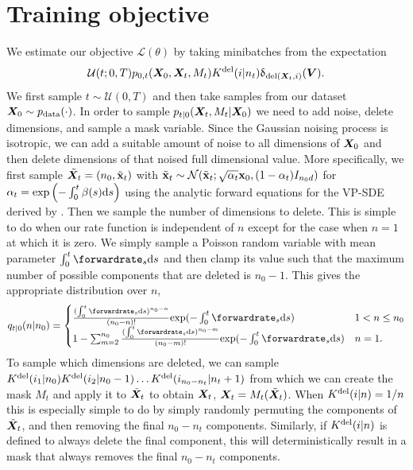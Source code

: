 \section{Training objective}
\label{sec:tddm-ApdxTrainingObjective}
We estimate our objective $\mathcal{L}(\theta)$ by taking minibatches from the expectation 
\begin{equation}
    \mathcal{U}(t; 0, T) p_{0,t}({\bm{X}}_0, {\bm{X}}_t, M_t) K^{\textup{del}}(i | n_t) \updelta_{\text{del}({\bm{X}}_t, i)}({\bm{V}}).
\end{equation}
We first sample $t \sim \mathcal{U}(0, T)$ and then take samples from our dataset ${\bm{X}}_0 \sim p_{\rm{data}}(\cdot)$. In order to sample $p_{t|0}({\bm{X}}_t, M_t | {\bm{X}}_0)$ we need to add noise, delete dimensions, and sample a mask variable. Since the Gaussian noising process is isotropic, we can add a suitable amount of noise to all dimensions of ${\bm{X}}_0$ and then delete dimensions of that noised full dimensional value. More specifically, we first sample $\tilde{{\bm{X}}}_t = (n_0, \tilde{{\mathbf{x}}}_t)$ with $\tilde{{\mathbf{x}}}_t \sim \mathcal{N}(\tilde{{\mathbf{x}}}_t; \sqrt{\alpha_t} {\mathbf{x}}_0, (1 - \alpha_t) I_{n_0 d})$ for $\alpha_t = \text{exp}\left( - \int_0^t \beta(s) \mathrm{d} s \right)$ using the analytic forward equations for the VP-SDE derived by \citet{song2020score}. Then we sample the number of dimensions to delete. This is simple to do when our rate function is independent of $n$ except for the case when $n=1$ at which it is zero. We simply sample a Poisson random variable with mean parameter $\int_0^t \forwardrate_s \rmd s$ and then clamp its value such that the maximum number of possible components that are deleted is $n_0 - 1$. This gives the appropriate distribution over $n$, 
\begin{equation}
    q_{t|0}(n | n_0) = \begin{cases}
         \frac{(\int_0^t \forwardrate_s \rmd s)^{n_0 - n}}{(n_0 - n)!} \text{exp}(- \int_0^t \forwardrate_s \rmd s)&\textstyle  1 < n \leq n_0 \\
        1 -  \sum_{m=2}^{n_0} \frac{(\int_0^t \forwardrate_s \rmd s)^{n_0 - m}}{(n_0 - m)!} \text{exp}(- \int_0^t \forwardrate_s \rmd s)  &\textstyle  n = 1.
    \end{cases}
\end{equation}
To sample which dimensions are deleted, we can sample $K^{\textup{del}}(i_1 | n_0) K^{\textup{del}}(i_2 | n_0-1) \dots K^{\textup{del}}(i_{n_0 - n_t} | n_t+1)$ from which we can create the mask $M_t$ and apply it to $\tilde{{\bm{X}}}_t$ to obtain ${\bm{X}}_t$, ${\bm{X}}_t = M_t(\tilde{{\bm{X}}}_t)$. When $K^{\textup{del}}(i | n) = 1/n$ this is especially simple to do by simply randomly permuting the components of $\tilde{{\bm{X}}}_t$, and then removing the final $n_0 - n_t$ components. Similarly, if $K^{\textup{del}}(i | n)$ is defined to always delete the final component, this will deterministically result in a mask that always removes the final $n_0 - n_t$ components.

